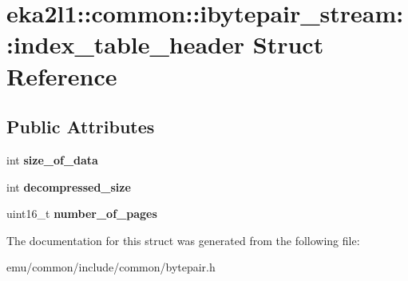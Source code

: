 \hypertarget{structeka2l1_1_1common_1_1ibytepair__stream_1_1index__table__header}{}\section{eka2l1\+:\+:common\+:\+:ibytepair\+\_\+stream\+:\+:index\+\_\+table\+\_\+header Struct Reference}
\label{structeka2l1_1_1common_1_1ibytepair__stream_1_1index__table__header}
\subsection*{Public Attributes}
\begin{DoxyCompactItemize}
\item 
\mbox{\label{structeka2l1_1_1common_1_1ibytepair__stream_1_1index__table__header_a0232e9c1086dc99b8f63bc0fa8cf80ae}} 
int {\bfseries size\+\_\+of\+\_\+data}
\item 
\mbox{\label{structeka2l1_1_1common_1_1ibytepair__stream_1_1index__table__header_ad57ea10f51b1a890a56ddb42767b5292}} 
int {\bfseries decompressed\+\_\+size}
\item 
\mbox{\label{structeka2l1_1_1common_1_1ibytepair__stream_1_1index__table__header_aeac26236a1952652315bef84ec3fe16f}} 
uint16\+\_\+t {\bfseries number\+\_\+of\+\_\+pages}
\end{DoxyCompactItemize}


The documentation for this struct was generated from the following file\+:\begin{DoxyCompactItemize}
\item 
emu/common/include/common/bytepair.\+h\end{DoxyCompactItemize}
